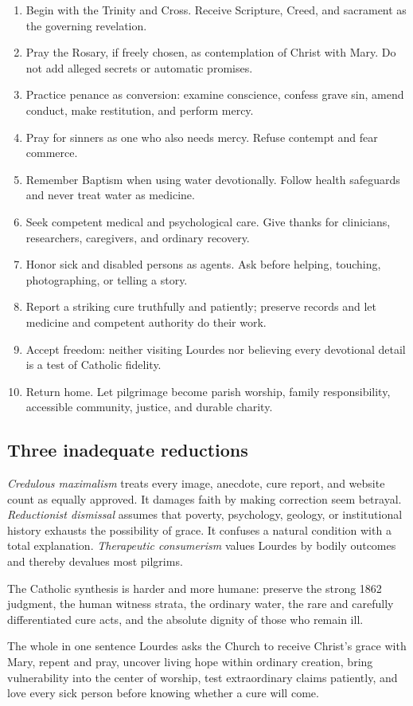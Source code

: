 \begin{enumerate}
  \item Begin with the Trinity and Cross. Receive Scripture, Creed, and sacrament as the governing revelation.
  \item Pray the Rosary, if freely chosen, as contemplation of Christ with Mary. Do not add alleged secrets or automatic promises.
  \item Practice penance as conversion: examine conscience, confess grave sin, amend conduct, make restitution, and perform mercy.
  \item Pray for sinners as one who also needs mercy. Refuse contempt and fear commerce.
  \item Remember Baptism when using water devotionally. Follow health safeguards and never treat water as medicine.
  \item Seek competent medical and psychological care. Give thanks for clinicians, researchers, caregivers, and ordinary recovery.
  \item Honor sick and disabled persons as agents. Ask before helping, touching, photographing, or telling a story.
  \item Report a striking cure truthfully and patiently; preserve records and let medicine and competent authority do their work.
  \item Accept freedom: neither visiting Lourdes nor believing every devotional detail is a test of Catholic fidelity.
  \item Return home. Let pilgrimage become parish worship, family responsibility, accessible community, justice, and durable charity.
\end{enumerate}

\subsection{Three inadequate reductions}

\emph{Credulous maximalism} treats every image, anecdote, cure report, and website count as equally approved. It damages faith by making correction seem betrayal. \emph{Reductionist dismissal} assumes that poverty, psychology, geology, or institutional history exhausts the possibility of grace. It confuses a natural condition with a total explanation. \emph{Therapeutic consumerism} values Lourdes by bodily outcomes and thereby devalues most pilgrims.

The Catholic synthesis is harder and more humane: preserve the strong 1862 judgment, the human witness strata, the ordinary water, the rare and carefully differentiated cure acts, and the absolute dignity of those who remain ill.

\begin{studybox}{The whole in one sentence}
Lourdes asks the Church to receive Christ's grace with Mary, repent and pray, uncover living hope within ordinary creation, bring vulnerability into the center of worship, test extraordinary claims patiently, and love every sick person before knowing whether a cure will come.
\end{studybox}
